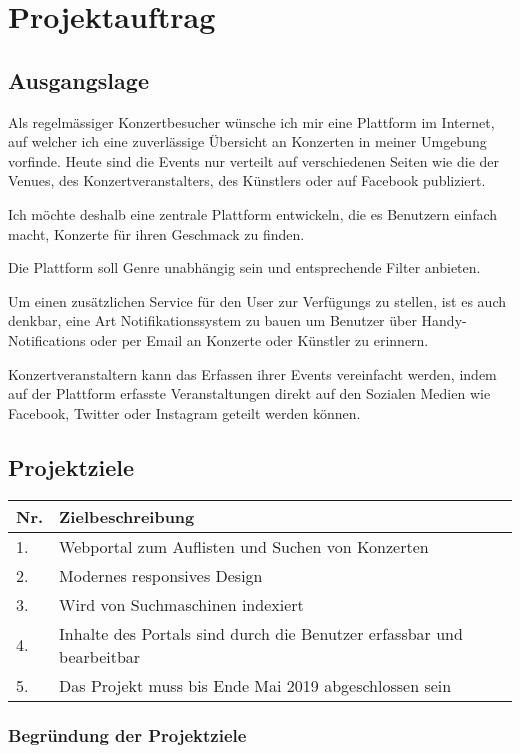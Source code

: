 \chapter{Projektauftrag}

\label{AppendixProjektauftrag}

\section{Ausgangslage}\label{ausgangslage}

Als regelmässiger Konzertbesucher wünsche ich mir eine Plattform im
Internet, auf welcher ich eine zuverlässige Übersicht an Konzerten in
meiner Umgebung vorfinde. Heute sind die Events nur verteilt auf
verschiedenen Seiten wie die der Venues, des Konzertveranstalters, des
Künstlers oder auf Facebook publiziert.

Ich möchte deshalb eine zentrale Plattform entwickeln, die es Benutzern
einfach macht, Konzerte für ihren Geschmack zu finden.

Die Plattform soll Genre unabhängig sein und entsprechende Filter
anbieten.

Um einen zusätzlichen Service für den User zur Verfügungs zu stellen,
ist es auch denkbar, eine Art Notifikationssystem zu bauen um Benutzer
über Handy-Notifications oder per Email an Konzerte oder Künstler zu
erinnern.

Konzertveranstaltern kann das Erfassen ihrer Events vereinfacht werden,
indem auf der Plattform erfasste Veranstaltungen direkt auf den Sozialen
Medien wie Facebook, Twitter oder Instagram geteilt werden können.

\section{Projektziele}\label{projektziele}

\begin{longtable}[]{@{}lll@{}}
\toprule
  Nr. & Zielbeschreibung\tabularnewline
\midrule
  1. & Webportal zum Auflisten und Suchen von Konzerten\tabularnewline
  2. & Modernes responsives Design\tabularnewline
  3. & Wird von Suchmaschinen indexiert\tabularnewline
  4. & Inhalte des Portals sind durch die Benutzer erfassbar und bearbeitbar\tabularnewline
  5. & Das Projekt muss bis Ende Mai 2019 abgeschlossen sein\tabularnewline
\bottomrule
\end{longtable}

\subsection{Begründung der
Projektziele}\label{begruxfcndung-der-projektziele}

